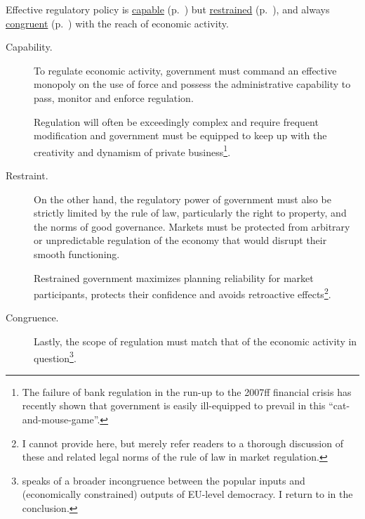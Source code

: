 Effective regulatory policy is \hyperref[itm:capability]{capable} (p.~\pageref{itm:capability}) but \hyperref[itm:restraint]{restrained} (p.~\pageref{itm:restraint}), and always \hyperref[itm:congruence]{congruent} (p.~\pageref{itm:congruence}) with the reach of economic activity.

\begin{description}
	\item[Capability.] \label{itm:capability} To regulate economic activity, government must command an effective monopoly on the use of force and possess the administrative capability to pass, monitor and enforce regulation. 

	Regulation will often be exceedingly complex and require frequent modification and government must be equipped to keep up with the creativity and dynamism of private business\footnote{
		The failure of bank regulation in the run-up to the 2007ff financial crisis has recently shown that government is easily ill-equipped to prevail in this ``cat-and-mouse-game''.}. 

	\item[Restraint.] \label{itm:restraint} On the other hand, the regulatory power of government must also be strictly limited by the rule of law, particularly the right to property, and the norms of good governance. Markets must be protected from arbitrary or unpredictable regulation of the economy that would disrupt their smooth functioning. 
	
	Restrained government maximizes planning reliability for market participants, protects their confidence and avoids retroactive effects\footnote{
		I cannot provide here, but merely refer readers to a thorough discussion of these and related legal norms of the rule of law in market regulation.}. %

	\item[Congruence.] \label{itm:congruence} Lastly, the scope of regulation must match that of the economic activity in question\footnote{
		\cite{Zurn-2000-aa} speaks of a broader incongruence between the popular inputs and (economically constrained) outputs of EU-level democracy. I return to in the conclusion.}.
	

\end{description}
